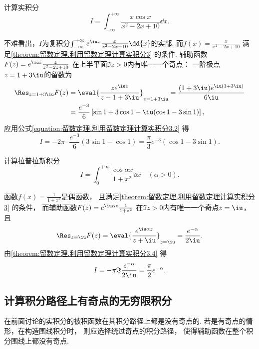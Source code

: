 \begin{example}
计算实积分\begin{equation*}
	I = \int_{-\infty}^{+\infty} \frac{x \cos x}{x^2-2x+10} \dd{x}.
\end{equation*}
\begin{solution}
不难看出，\(I\)为复积分\(\int_{-\infty}^{+\infty} e^{\iu x} \frac{x}{x^2-2x+10} \dd{x}\)的实部.
而\(f(x) = \frac{x}{x^2-2x+10}\)
满足\cref{theorem:留数定理.利用留数定理计算实积分3} 的条件.
辅助函数\(F(z) = e^{\iu z} \frac{z}{z^2-2z+10}\)
在上半平面\(\Im z > 0\)内有唯一一个奇点：
一阶极点\(z=1+3\iu\)的留数为\begin{align*}
	\Res_{z=1+3\iu} F(z)
	&= \eval{\frac{z e^{\iu z}}{z-1+3\iu}}_{z=1+3\iu}
		= \frac{(1+3\iu) e^{\iu(1+3\iu)}}{6\iu} \\
	&= \frac{e^{-3}}{6} \left[ \sin1+3\cos1-\iu(\cos1-3\sin1)\right],
\end{align*}
应用公式\cref{equation:留数定理.利用留数定理计算实积分3.2} 得\begin{equation*}
	I = -2\pi \cdot \frac{e^{-3}}{6} (3\sin1-\cos1)
	= \frac{\pi}{3} e^{-3} (\cos1-3\sin1).
\end{equation*}
\end{solution}
\end{example}

\begin{example}
计算拉普拉斯积分\begin{equation*}
	I = \int_0^{+\infty} \frac{\cos \alpha x}{1+x^2} \dd{x} \quad(\alpha>0).
\end{equation*}
\begin{solution}
函数\(f(x) = \frac{1}{1+x^2}\)是偶函数，
且满足\cref{theorem:留数定理.利用留数定理计算实积分3} 的条件，
而辅助函数\(F(z) = e^{\iu\alpha z} \frac{1}{1+z^2}\)
在\(\Im z > 0\)内有唯一一个奇点\(z=\iu\)，
且\begin{equation*}
	\Res_{z=\iu} F(z) = \eval{\frac{e^{\iu\alpha z}}{z+\iu}}_{z=\iu}
	= \frac{e^{-\alpha}}{2\iu}.
\end{equation*}
由\cref{theorem:留数定理.利用留数定理计算实积分3.4} 得\begin{equation*}
	I = -\pi \Im \frac{e^{-\alpha}}{2\iu}
	= \frac{\pi}{2} e^{-\alpha}.
\end{equation*}
\end{solution}
\end{example}

\subsection{计算积分路径上有奇点的无穷限积分}
在前面讨论的实积分的被积函数在其积分路径上都是没有奇点的.
若是有奇点的情形，在构造围线积分时，
则应选择绕过奇点的积分路径，
使得辅助函数在整个积分围线上都没有奇点.

